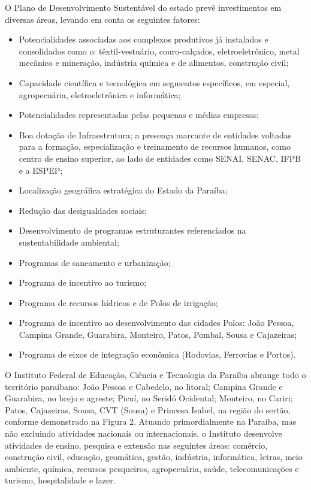 	O Plano de Desenvolvimento Sustentável do estado prevê investimentos em diversas áreas, levando em conta os seguintes fatores: 

\begin{itemize}
	\item 	Potencialidades associadas aos complexos produtivos já instalados e consolidados como o: têxtil-vestuário, couro-calçados, eletroeletrônico, metal mecânico 	 	e mineração, indústria química e de alimentos, construção civil; 
	\item 	Capacidade científica e tecnológica em segmentos específicos, em especial, agropecuária, eletroeletrônica e informática; 
	\item 	Potencialidades representadas pelas pequenas e médias empresas; 
	\item 	Boa dotação de Infraestrutura; a presença marcante de entidades voltadas para a formação, especialização e treinamento de recursos humanos, como centro de 		ensino superior, ao lado de entidades como SENAI, SENAC, IFPB e a ESPEP; 
	\item 	Localização geográfica estratégica do Estado da Paraíba; 
	\item 	Redução das desigualdades sociais; 
	\item 	Desenvolvimento de programas estruturantes referenciados na sustentabilidade ambiental; 
	\item 	Programas de saneamento e urbanização;
	\item 	Programa de incentivo ao turismo;
	\item 	Programa de recursos hídricos e de Polos de irrigação;
	\item 	Programa de incentivo ao desenvolvimento das cidades Polos: João Pessoa, Campina Grande, Guarabira, Monteiro, Patos, Pombal, Sousa e Cajazeiras; 
	\item 	Programa de eixos de integração econômica (Rodovias, Ferrovias e Portos).
\end{itemize}
	
	O Instituto Federal de Educação, Ciência e Tecnologia da Paraíba abrange todo o território paraibano: João Pessoa e Cabedelo, no litoral; Campina Grande e Guarabira, no brejo e agreste; Picuí, no Seridó Ocidental; Monteiro, no Cariri; Patos, Cajazeiras, Sousa, CVT (Sousa) e Princesa Isabel, na região do sertão, conforme demonstrado na Figura 2. Atuando primordialmente na Paraíba, mas não excluindo atividades nacionais ou internacionais, o Instituto desenvolve atividades de ensino, pesquisa e extensão nas seguintes áreas: comércio, construção civil, educação, geomática, gestão, indústria, informática, letras, meio ambiente, química, recursos pesqueiros, agropecuária, saúde, telecomunicações e turismo, hospitalidade e lazer.
	
